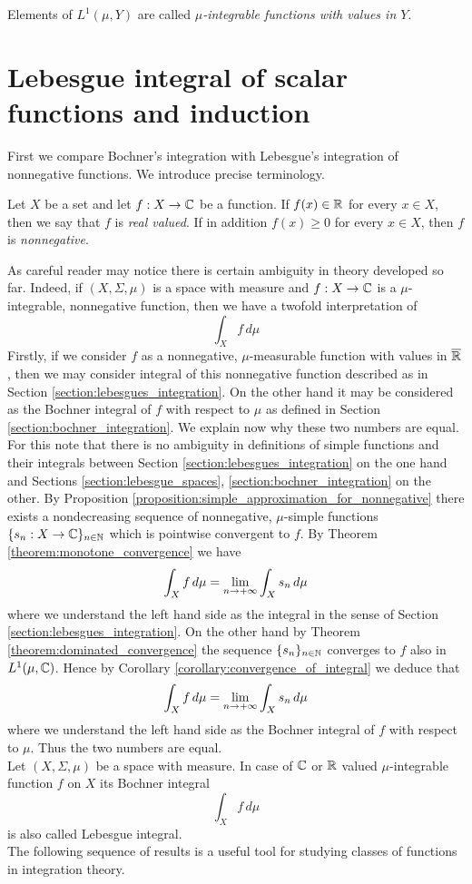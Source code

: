 \begin{definition}
Elements of $L^1(\mu,Y)$ are called \textit{$\mu$-integrable functions with values in $Y$}.
\end{definition}

\section{Lebesgue integral of scalar functions and induction}
\noindent
First we compare Bochner's integration with Lebesgue's integration of nonnegative functions. We introduce precise terminology.

\begin{definition}
Let $X$ be a set and let $f:X\rightarrow {\mathbb C}$ be a function. If $f(x)\in {\mathbb R}$ for every $x\in X$, then we say that $f$ is \textit{real valued}. If in addition $f(x)\geq 0$ for every $x\in X$, then $f$ is \textit{nonnegative}.
\end{definition}
\noindent
As careful reader may notice there is certain ambiguity in theory developed so far. Indeed, if $(X,\Sigma,\mu)$ is a space with measure and $f:X\rightarrow {\mathbb C}$ is a $\mu$-integrable, nonnegative function, then we have a twofold interpretation of
$$\int_Xf\,d\mu$$
Firstly, if we consider $f$ as a nonnegative, $\mu$-measurable function with values in $\overline{{\mathbb R}}$, then we may consider integral of this nonnegative function described as in Section \ref{section:lebesgues_integration}. On the other hand it may be considered as the Bochner integral of $f$ with respect to $\mu$ as defined in Section \ref{section:bochner_integration}. We explain now why these two numbers are equal. For this note that there is no ambiguity in definitions of simple functions and their integrals between Section \ref{section:lebesgues_integration} on the one hand and Sections \ref{section:lebesgue_spaces}, \ref{section:bochner_integration} on the other. By Proposition \ref{proposition:simple_approximation_for_nonnegative} there exists a nondecreasing sequence of nonnegative, $\mu$-simple functions $\{s_n:X\rightarrow {\mathbb C}\}_{n\in {\mathbb N}}$ which is pointwise convergent to $f$. By Theorem \ref{theorem:monotone_convergence} we have
$$\int_Xf\,d\mu = \lim_{n\rightarrow +\infty}\int_Xs_n\,d\mu$$
where we understand the left hand side as the integral in the sense of Section \ref{section:lebesgues_integration}. On the other hand by Theorem \ref{theorem:dominated_convergence} the sequence $\{s_n\}_{n\in {\mathbb N}}$ converges to $f$ also in $L^1(\mu,{\mathbb C})$. Hence by Corollary \ref{corollary:convergence_of_integral} we deduce that
$$\int_Xf\,d\mu = \lim_{n\rightarrow +\infty}\int_Xs_n\,d\mu$$
where we understand the left hand side as the Bochner integral of $f$ with respect to $\mu$. Thus the two numbers are equal.\\
Let $(X,\Sigma, \mu)$ be a space with measure. In case of ${\mathbb C}$ or ${\mathbb R}$ valued $\mu$-integrable function $f$ on $X$ its Bochner integral
$$\int_X f\,d\mu$$
is also called Lebesgue integral.\\
The following sequence of results is a useful tool for studying classes of functions in integration theory.

